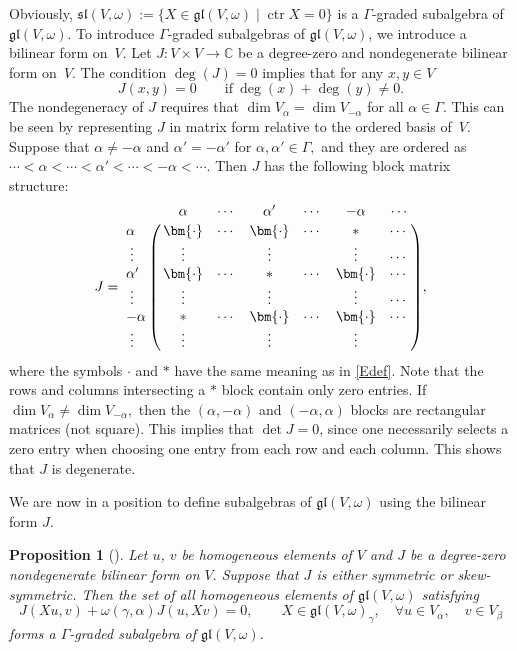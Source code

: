 \documentclass[10pt,a4paper]{amsart}
\numberwithin{equation}{section}
\newtheorem{Proposition}[Theorem]{Proposition}
\theoremstyle{definition}
\def\gl{\mathfrak{gl}}
\def\sl{\mathfrak{sl}}
\begin{document}
Obviously,
$ \sl(V,\omega) := \{ X \in \gl(V,\omega)\mid \operatorname{ctr} X = 0 \} $
is a $\Gamma$-graded subalgebra of $\gl(V,\omega). $
To introduce $\Gamma$-graded subalgebras of $\gl(V,\omega)$, we introduce a bilinear form on~$V$.
Let $ J\colon V \times V \to \mathbb{C}$ be a degree-zero and nondegenerate bilinear form on~$V$.
The condition $\deg(J) = 0 $ implies that for any $ x, y \in V$
\begin{equation*}
	J(x,y) = 0 \qquad \text{if} \ \deg(x) + \deg(y) \neq 0.
\end{equation*}
The nondegeneracy of $J$ requires that $ \dim V_{\alpha} = \dim V_{-\alpha} $ for all $\alpha \in \Gamma$.
This can be seen by representing $J$ in matrix form relative to the ordered basis of~$V$.
Suppose that $ \alpha \neq -\alpha $ and $ \alpha' = -\alpha'$ for $ \alpha, \alpha' \in \Gamma,$ and they are ordered as $ \cdots < \alpha < \cdots < \alpha' < \cdots < - \alpha < \cdots $.
Then $J$ has the following block matrix structure:
\begin{equation*}
	J =
	\bordermatrix{ & \alpha & \cdots & \alpha' & \cdots& -\alpha & \cdots \cr
		\alpha & \bm{\cdot} & \cdots & \bm{\cdot} & \cdots & \ast & \cdots \cr
		\; \vdots & \vdots & & \vdots & & \vdots & \cdots \cr
		\alpha' & \bm{\cdot} & \cdots & \ast & \cdots & \bm{\cdot} & \cdots \cr
		\; \vdots & \vdots & & \vdots & & \vdots & \cdots \cr
		-\alpha & \ast & \cdots & \bm{\cdot} & \cdots & \bm{\cdot} & \cdots \cr
		\;\vdots & \vdots & & \vdots & & \vdots &
	},
\end{equation*}
where the symbols $ \bm{\cdot}$ and $\ast$ have the same meaning as in \eqref{Edef}.
Note that the rows and columns intersecting a $\ast$ block contain only zero entries.
If $\dim V_{\alpha} \neq \dim V_{-\alpha},$ then the $(\alpha,-\alpha)$ and $(-\alpha,\alpha)$ blocks are rectangular matrices (not square).
This implies that $\det J = 0$, since one necessarily selects a zero entry when choosing one entry from each row and each column.
This shows that $J$ is degenerate.

We are now in a position to define subalgebras of $\gl(V,\omega)$ using the bilinear form $J.$

\begin{Proposition}[\cite{scheuTen}]\label{Prop:SulAlg}
	Let $ u$, $v$ be homogeneous elements of $V$ and $ J$ be a degree-zero nondegenerate bilinear form on $V.$
	Suppose that $J$ is either symmetric or skew-symmetric.
	Then the set of all homogeneous elements of $\gl(V,\omega)$ satisfying
\begin{equation}
J(Xu,v)+ \omega(\gamma,\alpha) J(u,Xv) = 0, \qquad X \in \gl(V,\omega)_{\gamma},\quad \forall u \in V_{\alpha}, \quad v \in V_{\beta}	\label{SubalgCond}
\end{equation}
	forms a $\Gamma$-graded subalgebra of $\gl(V,\omega)$.
\end{Proposition}
\end{document}

